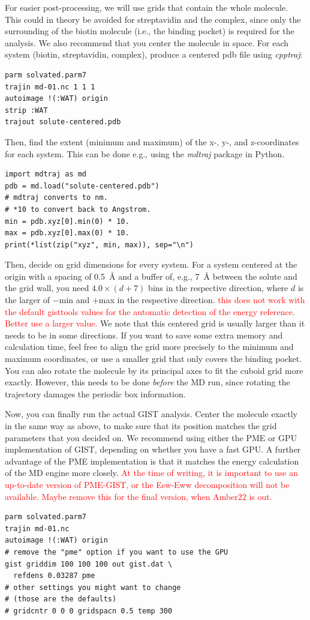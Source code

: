 \documentclass[9pt,tutorial]{livecoms}
\newcommand{\software}{\emph}
\newcommand{\todo}{\textcolor{red}}
\begin{document}
For easier post-processing, we will use grids that contain the whole molecule.
This could in theory be avoided for streptavidin and the complex, since only the surrounding of the biotin molecule (i.e., the binding pocket) is required for the analysis.
We also recommend that you center the molecule in space.
For each system (biotin, streptavidin, complex), produce a centered pdb file using \software{cpptraj}:
\begin{lstlisting}
parm solvated.parm7
trajin md-01.nc 1 1 1
autoimage !(:WAT) origin
strip :WAT
trajout solute-centered.pdb
\end{lstlisting}
Then, find the extent (minimum and maximum) of the x-, y-, and z-coordinates for each system.
This can be done e.g., using the \software{mdtraj} package in Python.
\begin{lstlisting}[style=python]
import mdtraj as md
pdb = md.load("solute-centered.pdb")
# mdtraj converts to nm.
# *10 to convert back to Angstrom.
min = pdb.xyz[0].min(0) * 10.
max = pdb.xyz[0].max(0) * 10.
print(*list(zip("xyz", min, max)), sep="\n")
\end{lstlisting}
Then, decide on grid dimensions for every system.
For a system centered at the origin with a spacing of \SI{0.5}{\angstrom} and a buffer of, e.g., \SI{7}{\angstrom} between the solute and the grid wall, you need $4.0\times (d+7)$ bins in the respective direction, where $d$ is the larger of $-$min and $+$max in the respective direction.
\todo{this does not work with the default gisttools values for the automatic detection of the energy reference. Better use a larger value. }
We note that this centered grid is usually larger than it needs to be in some directions.
If you want to save some extra memory and calculation time, feel free to align the grid more precisely to the minimum and maximum coordinates, or use a smaller grid that only covers the binding pocket.
You can also rotate the molecule by its principal axes to fit the cuboid grid more exactly.
However, this needs to be done \emph{before} the MD run, since rotating the trajectory damages the periodic box information.

Now, you can finally run the actual GIST analysis. Center the molecule exactly in the same way as above, to make sure that its position matches the grid parameters that you decided on.
We recommend using either the PME or GPU implementation of GIST, depending on whether you have a fast GPU.
A further advantage of the PME implementation is that it matches the energy calculation of the MD engine more closely.
\todo{At the time of writing, it is important to use an up-to-date version of PME-GIST, or the Esw-Eww decomposition will not be available. Maybe remove this for the final version, when Amber22 is out.}
\begin{lstlisting}
parm solvated.parm7
trajin md-01.nc
autoimage !(:WAT) origin
# remove the "pme" option if you want to use the GPU
gist griddim 100 100 100 out gist.dat \
  refdens 0.03287 pme
# other settings you might want to change
# (those are the defaults)
# gridcntr 0 0 0 gridspacn 0.5 temp 300
\end{lstlisting}
\end{document}
